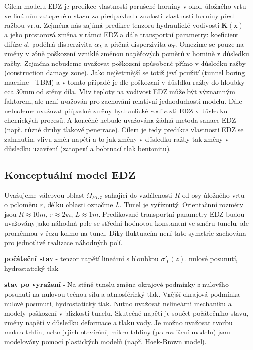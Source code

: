 \documentclass{article}
\def\vc#1{\mathbf{\boldsymbol{#1}}}     %
\def\tn#1{\boldsymbol{#1}}
\begin{document}
\label{sec:model_EDZ}
Cílem modelu EDZ je predikce vlastností porušené horniny v okolí úložného vrtu ve finálním 
zatopeném stavu za předpokladu znalosti vlastností horniny před ražbou vrtu. 
Zejména nás zajímá predikce tenzoru hydraulické vodivosti $\tn K(\vc x)$ 
a jeho prostorová změna v rámci EDZ a dále transportní parametry: 
koeficient difúze $d$, podélná disperzivita $\alpha_L$ a příčná disperzivita $\alpha_T$. 
Omezíme se pouze na změny v zóně poškození vzniklé změnou napěťových poměrů v hornině 
v důsledku ražby. Zejména nebudeme uvažovat poškození způsobené přímo v důsledku ražby 
(construction damage zone).
Jako nejšetrnější se totiž jeví použití (tunnel boring machine - TBM) 
a v tomto případě je dle \cite{SURAO_50/2016} poškození v důsldku ražby 
do hloubky cca 30mm od stěny díla. 
Vliv teploty na vodivost EDZ může být významným faktorem, ale není uvažován pro zachování 
relativní jednoduchosti modelu. Dále nebudeme uvažovat případné změny hydraulické vodivosti 
EDZ v důsledku chemických procesů. A konečně nebude uvažována žádná metoda sanace EDZ 
(např. různé druhy tlakové penetrace). Cílem je tedy predikce vlastností EDZ se 
zahrnutím vlivu změn napětí a to jak změny v důsledku ražby tak změny v důsledku uzavření 
(zatopení a bobtnací tlak bentonitu).

\subsection{Konceptuální model EDZ}
Uvažujeme válcovou oblast $\Omega_{EDZ}$ sahající do vzdálenosti $R$ od osy úložného vrtu o poloměru $r$, délku oblasti označme $L$. Tunel je vyříznutý. Orientačnní rozměry jsou $R\approx 10m$, $r\approx 2m$, $L\approx 1m$. 
Predikované transportní parametry EDZ budou uvažovány jako náhodná pole se střední hodnotou
konstantní ve směru tunelu, ale proměnnou v řezu kolmo na tunel. Díky fluktuacím není tato symetrie zachována pro jednotlivé realizace náhodných polí.

{\bf počáteční stav} - tenzor napětí lineární s hloubkou $\sigma'_0(z)$, nulové posunutí, hydrostatický tlak
                       
{\bf stav po vyražení} - Na stěně tunelu změna okrajové podmínky z nulového posunutí na nulovou tečnou sílu a 
                         atmosférický tlak. Vnější okrajová podmínka nulové posunutí, hydrostatický tlak.
                         Nutno uvažovat nelineární mechaniku a modely poškození v blízkosti tunelu.
                         Skutečné napětí je součet počátečního stavu, změny napětí v důsledku deformace a tlaku vody.
                         Je možno uvažovat tvorbu makro trhlin, nebo jejich otevírání, mikro trhliny (po rozlišení modelu)
                         jsou modelovány pomocí plastických modelů (např. Hoek-Brown model).
                         
\end{document}
